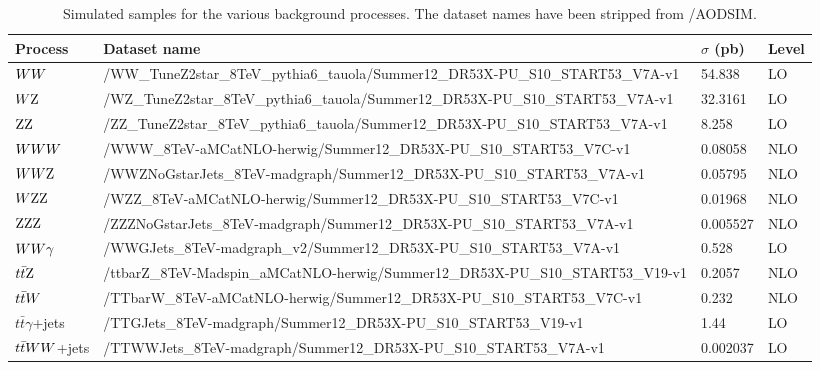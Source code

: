 \begin{sidewaystable}
\fontsize{6 pt}{1 em}
\selectfont
\caption{Simulated samples for the various background processes. The dataset names have been
stripped from /AODSIM.}
\begin{center}
\begin{tabular}{l l l l}
\toprule
Process & Dataset name & $\sigma$ (pb) & Level \\
\midrule
$WW$ & /WW\_TuneZ2star\_8TeV\_pythia6\_tauola/Summer12\_DR53X-PU\_S10\_START53\_V7A-v1 &
54.838 & LO \\
$W\mathrm{Z}$ & /WZ\_TuneZ2star\_8TeV\_pythia6\_tauola/Summer12\_DR53X-PU\_S10\_START53\_V7A-v1 
& 32.3161 & LO \\
$\mathrm{Z}\mathrm{Z}$ & /ZZ\_TuneZ2star\_8TeV\_pythia6\_tauola/Summer12\_DR53X-PU\_S10\_START53\_V7A-v1
& 8.258 & LO \\
\midrule
$WWW$ & /WWW\_8TeV-aMCatNLO-herwig/Summer12\_DR53X-PU\_S10\_START53\_V7C-v1 & 0.08058 & NLO \\
$WW\mathrm{Z}$ & /WWZNoGstarJets\_8TeV-madgraph/Summer12\_DR53X-PU\_S10\_START53\_V7A-v1 & 0.05795 & NLO
\\
$W\mathrm{Z}\mathrm{Z}$ & /WZZ\_8TeV-aMCatNLO-herwig/Summer12\_DR53X-PU\_S10\_START53\_V7C-v1 & 0.01968 & NLO
\\
$\mathrm{Z}\mathrm{Z}\mathrm{Z}$ & /ZZZNoGstarJets\_8TeV-madgraph/Summer12\_DR53X-PU\_S10\_START53\_V7A-v1 & 0.005527
& NLO \\
$WW\gamma$ & /WWGJets\_8TeV-madgraph\_v2/Summer12\_DR53X-PU\_S10\_START53\_V7A-v1 & 0.528 & LO \\
\midrule
$t\bar{t}\mathrm{Z}$ & /ttbarZ\_8TeV-Madspin\_aMCatNLO-herwig/Summer12\_DR53X-PU\_S10\_START53\_V19-v1 
& 0.2057 & NLO \\
$t\bar{t}W$ & /TTbarW\_8TeV-aMCatNLO-herwig/Summer12\_DR53X-PU\_S10\_START53\_V7C-v1 & 0.232 & NLO
\\
$t\bar{t}\gamma$+jets & /TTGJets\_8TeV-madgraph/Summer12\_DR53X-PU\_S10\_START53\_V19-v1 & 1.44 & LO
\\
$t\bar{t}WW$+jets & /TTWWJets\_8TeV-madgraph/Summer12\_DR53X-PU\_S10\_START53\_V7A-v1 & 0.002037 &
LO \\
\bottomrule
\end{tabular}
\end{center}
\label{tab:boost_mc_bg2}
\end{sidewaystable}

